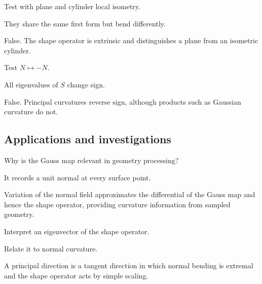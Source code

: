 \begin{exercise}\label{exr:vii16-ped-11}
Test with plane and cylinder local isometry.
\end{exercise}
\begin{hint}
They share the same first form but bend differently.
\end{hint}
\begin{solution}
False.  The shape operator is extrinsic and distinguishes a plane from an isometric cylinder.
\end{solution}

\begin{exercise}\label{exr:vii16-ped-12}
Test \(N\mapsto-N\).
\end{exercise}
\begin{hint}
All eigenvalues of \(S\) change sign.
\end{hint}
\begin{solution}
False.  Principal curvatures reverse sign, although products such as Gaussian curvature do not.
\end{solution}

\subsection*{Applications and investigations}

\begin{exercise}\label{exr:vii16-ped-13}
Why is the Gauss map relevant in geometry processing?
\end{exercise}
\begin{hint}
It records a unit normal at every surface point.
\end{hint}
\begin{solution}
Variation of the normal field approximates the differential of the Gauss map and hence the shape operator, providing curvature information from sampled geometry.
\end{solution}

\begin{exercise}\label{exr:vii16-ped-14}
Interpret an eigenvector of the shape operator.
\end{exercise}
\begin{hint}
Relate it to normal curvature.
\end{hint}
\begin{solution}
A principal direction is a tangent direction in which normal bending is extremal and the shape operator acts by simple scaling.
\end{solution}

